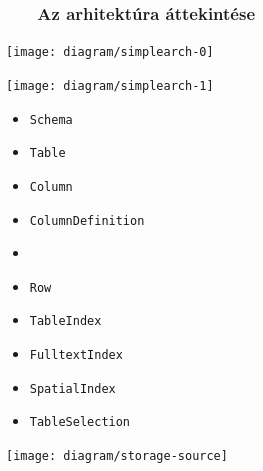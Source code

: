 \documentclass[
    aspectratio=169,
]{beamer}
\newcommand{\slidetitle}[2]{\frametitle{{\small #1 ~ \ding{226} ~ } \normalsize \textbf{#2} }}
\begin{document}
\begin{frame}
    \slidetitle{\sectionshorttitle}{Az arhitektúra áttekintése}
    
    \centering
    
    \begin{minipage}[c]{0.4\textwidth}
        \begin{overprint}
            \centerline{\texttt{[image: diagram/simplearch-0]}}
            \centerline{\texttt{[image: diagram/simplearch-1]}}
        \end{overprint}
    \end{minipage}%
    \hspace*{\fill}
    \begin{minipage}[c]{0.29\textwidth}
        \begin{overprint}
            \begin{itemize}
                \item \texttt{Schema}
                \item \texttt{Table}
                \item \texttt{Column}
                \item \texttt{ColumnDefinition}
                \item {}
                \item \texttt{Row}
                \item \texttt{TableIndex}
                \item \texttt{FulltextIndex}
                \item \texttt{SpatialIndex}
                \item \texttt{TableSelection}
            \end{itemize}
        \end{overprint}
    \end{minipage}%
    \begin{minipage}[c]{0.29\textwidth}
        \begin{overprint}
            \centerline{\texttt{[image: diagram/storage-source]}}
        \end{overprint}
    \end{minipage}%
    \hspace*{\fill}%
\end{frame}
\end{document}
